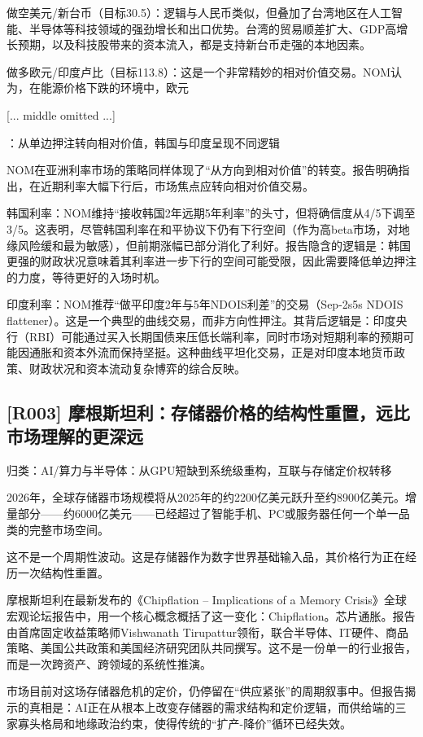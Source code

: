 \documentclass[11pt]{ctexart}
\begin{document}
做空美元/新台币（目标30.5）：逻辑与人民币类似，但叠加了台湾地区在人工智能、半导体等科技领域的强劲增长和出口优势。台湾的贸易顺差扩大、GDP高增长预期，以及科技股带来的资本流入，都是支持新台币走强的本地因素。

做多欧元/印度卢比（目标113.8）：这是一个非常精妙的相对价值交易。NOM认为，在能源价格下跌的环境中，欧元

[... middle omitted ...]

：从单边押注转向相对价值，韩国与印度呈现不同逻辑

NOM在亚洲利率市场的策略同样体现了“从方向到相对价值”的转变。报告明确指出，在近期利率大幅下行后，市场焦点应转向相对价值交易。

韩国利率：NOM维持“接收韩国2年远期5年利率”的头寸，但将确信度从4/5下调至3/5。这表明，尽管韩国利率在和平协议下仍有下行空间（作为高beta市场，对地缘风险缓和最为敏感），但前期涨幅已部分消化了利好。报告隐含的逻辑是：韩国更强的财政状况意味着其利率进一步下行的空间可能受限，因此需要降低单边押注的力度，等待更好的入场时机。

印度利率：NOM推荐“做平印度2年与5年NDOIS利差”的交易（Sep-2s5s NDOIS flattener）。这是一个典型的曲线交易，而非方向性押注。其背后逻辑是：印度央行（RBI）可能通过买入长期国债来压低长端利率，同时市场对短期利率的预期可能因通胀和资本外流而保持坚挺。这种曲线平坦化交易，正是对印度本地货币政策、财政状况和资本流动复杂博弈的综合反映。

\subsection{[R003] 摩根斯坦利：存储器价格的结构性重置，远比市场理解的更深远}
{\small\color{refgray}归类：AI/算力与半导体：从GPU短缺到系统级重构，互联与存储定价权转移}

2026年，全球存储器市场规模将从2025年的约2200亿美元跃升至约8900亿美元。增量部分——约6000亿美元——已经超过了智能手机、PC或服务器任何一个单一品类的完整市场空间。

这不是一个周期性波动。这是存储器作为数字世界基础输入品，其价格行为正在经历一次结构性重置。

摩根斯坦利在最新发布的《Chipflation – Implications of a Memory Crisis》全球宏观论坛报告中，用一个核心概念概括了这一变化：Chipflation。芯片通胀。报告由首席固定收益策略师Vishwanath Tirupattur领衔，联合半导体、IT硬件、商品策略、美国公共政策和美国经济研究团队共同撰写。这不是一份单一的行业报告，而是一次跨资产、跨领域的系统性推演。

市场目前对这场存储器危机的定价，仍停留在“供应紧张”的周期叙事中。但报告揭示的真相是：AI正在从根本上改变存储器的需求结构和定价逻辑，而供给端的三家寡头格局和地缘政治约束，使得传统的“扩产-降价”循环已经失效。
\end{document}

